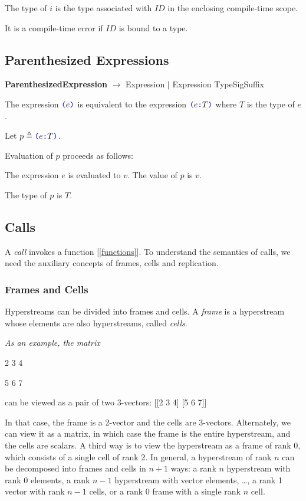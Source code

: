 \documentclass{article}
\begin{document}
The type of $i$ is the type associated with $ID$ in the enclosing compile-time scope.

It is a compile-time error if $ID$ is bound to a type. 


\subsection{Parenthesized Expressions}
\label{parenthesizedExpressions}

{\bf ParenthesizedExpression} $\rightarrow$ \LPAREN{} Expression \RPAREN{} $|$ \LPAREN{} Expression TypeSigSuffix \RPAREN{}


The expression  $\texttt{\color{blue} (}{}e \texttt{\color{blue} )}{}$ is equivalent to the expression $\texttt{\color{blue} (}{}e \texttt{\color{blue} :}{} T \texttt{\color{blue} )}{}$ where $T$ is the type of $e$.

Let $p \triangleq \texttt{\color{blue} (}{}e \texttt{\color{blue} :}{} T \texttt{\color{blue} )}{}$.

Evaluation of $p$ proceeds as follows:

The expression $e$ is evaluated to $v$. The value of $p$ is $v$.

The type of $p$ is $T$.

\subsection{Calls}
\label{calls}

A {\em call} invokes a function [\ref{functions}]. To understand the semantics of calls, we need the auxiliary concepts of frames, cells and replication.


\subsubsection{Frames and Cells}
\label{framesAndCells}

Hyperstreams can be divided into frames and cells. A {\em frame} is a hyperstream whose elements are also hyperstreams, called {\em cells}.

{\em As an example, the matrix 

2 3 4

5 6 7

 can be viewed as a pair of two 3-vectors:
[[2 3 4] [5 6 7]]

In that case, the frame is a 2-vector and the cells are 3-vectors.  Alternately, we can view it as a matrix, in which case the frame is the entire hyperstream, and the cells are scalars. A third way is to view the hyperstream as a frame of rank 0, which consists of a single cell of rank 2. In general, a hyperstream of rank $n$ can be decomposed into frames and cells in $n+1$ ways: a rank $n$ hyperstream with rank 0 elements, a rank $n-1$ hyperstream with vector elements, …, a rank 1 vector with rank $n-1$ cells, or a rank 0 frame with a single rank $n$ cell.
}
\end{document}
